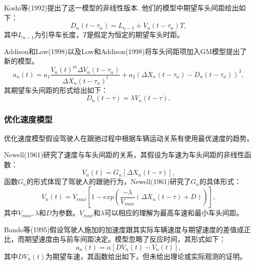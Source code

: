Koshi等(1992)提出了这一模型的非线性版本\cite{M.Koshi1992}. 他们的模型中期望车头间距给出如下：
\begin{equation}
D_n(t-\tau_n)=L_{n-1}+V_n(t-\tau_n)T,
\end{equation}
其中$L_{n-1}$为引导车长度，$T$是假定为恒定的期望车头时距。

Addison和Low(1998)以及Low和Addison(1998)将车头间距项加入GM模型提出了新的模型\cite{Addison1998,Low1998}。
\begin{equation}
a_n(t)=a_1\frac{V_n(t)^m\Delta V_n(t-\tau_n)}{\Delta X_n(t-\tau_n)^l}+a_2(\Delta X_n(t-\tau_n)-D_n(t-\tau_n))^3,
\end{equation}
其期望车头间距的形式给出如下：
\begin{equation}
D_n(t-\tau)=\lambda V_n(t-\tau),
\end{equation}

\subsubsection{优化速度模型}
优化速度模型假设驾驶人在跟驰过程中根据车辆运动关系有使用最优速度的趋势。

Newell(1961)研究了速度与车头间距的关系，其假设为车速为车头间距的非线性函数\cite{Newell1961}：
\begin{equation}
V_n(t)=G_n[\Delta X_n(t-\tau)],
\end{equation}
函数$G_n$的形式体现了驾驶人的跟驰行为，Newell(1961)研究了$G_n$的具体形式\cite{Newell1961}：
\begin{equation}
V_n(t)=V_{max}\left[1-exp\left(\frac{-\lambda}{V_{max}}(\Delta X_n(t-\tau)+D)\right)\right],
\end{equation}
其中$V_{max},\lambda$和$D$为参数。$V_{max}$和$\lambda$可以相应的理解为最高车速和最小车头间距。

Bando等(1995)假设驾驶人施加的加速度跟其实际车辆速度与期望速度的差值成正比，而期望速度由与前车间距决定\cite{Bando1995}。模型忽略了反应时间，其形式如下：
\begin{equation}
a_n(t)=\alpha[DV_n(t)-V_n(t)],
\end{equation}
其中$DV_n(t)$为期望车速，其函数给出如下，但未给出理论或实际观测的证明。

